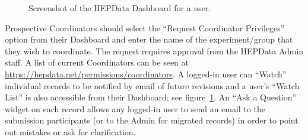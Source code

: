 \documentclass[a4paper]{jpconf}
\begin{document}
\begin{figure}
  \begin{center}
  \end{center}
  \caption{\label{fig:dashboard}Screenshot of the HEPData Dashboard for a user.}
\end{figure}
%
Prospective Coordinators should select the ``Request Coordinator Privileges''
option from their Dashboard and enter the name of the experiment/group that
they wish to coordinate.  The request requires approval from the HEPData Admin
staff.  A list of current Coordinators can be seen at
\url{https://hepdata.net/permissions/coordinators}.  A logged-in user can
``Watch'' individual records to be notified by email of future revisions and a
user's ``Watch List'' is also accessible from their Dashboard; see
figure~\ref{fig:dashboard}.  An ``Ask a Question'' widget on each record allows
any logged-in user to send an email to the submission participants (or to the
Admin for migrated records) in order to point out mistakes or ask for
clarification.
\end{document}

